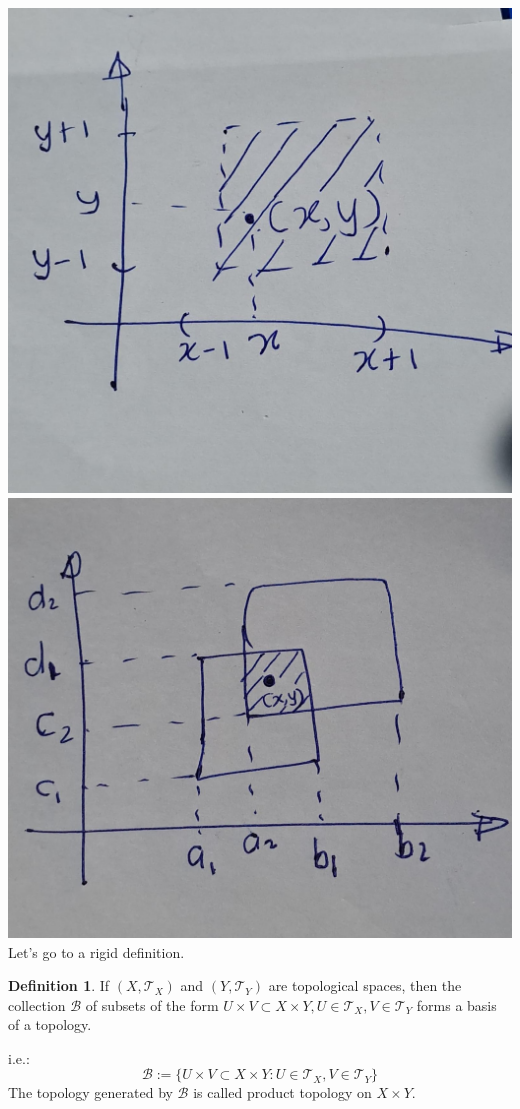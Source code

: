 \documentclass[
]{book}
\theoremstyle{definition}
\newtheorem{definition}{Definition}[chapter]
\theoremstyle{definition}
\theoremstyle{definition}
\theoremstyle{definition}
\theoremstyle{remark}
\begin{document}
\includegraphics{figures/figure 04.jpg}
\includegraphics{figures/figure 05.jpg}
Let's go to a rigid definition.

\begin{definition}
\protect\hypertarget{def:unnamed-chunk-34}{}\label{def:unnamed-chunk-34}If \(\left(X, \mathcal{T}_{X}\right)\) and \(\left(Y, \mathcal{T}_{Y}\right)\) are topological spaces, then the collection \(\mathcal{B}\) of subsets of the form \(U \times V \subset X \times Y, U \in \mathcal{T}_{X}, V \in \mathcal{T}_{Y}\) forms a basis of a topology.

i.e.:
\[\mathcal{B}:=\{U \times V \subset X \times Y: U \in \mathcal{T}_{X}, V \in \mathcal{T}_{Y}\}\]
The topology generated by \(\mathcal{B}\) is called product topology on \(X \times Y\).
\end{definition}
\end{document}
